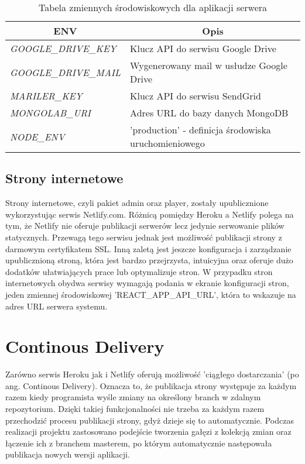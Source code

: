 \begin{table}[h!]
\centering
\begin{tabular}{|l|l|}
\hline
\multicolumn{1}{|c|}{\textbf{ENV}} & \multicolumn{1}{c|}{\textbf{Opis}} \\ \hline
\textit{GOOGLE\_DRIVE\_KEY} & Klucz API do serwisu Google Drive \\ \hline
\textit{GOOGLE\_DRIVE\_MAIL} & Wygenerowany mail w usłudze Google Drive \\ \hline
\textit{MARILER\_KEY} & Klucz API do serwisu SendGrid \\ \hline
\textit{MONGOLAB\_URI} & Adres URL do bazy danych MongoDB \\ \hline
\textit{NODE\_ENV} & 'production' - definicja środowiska uruchomieniowego \\ \hline
\end{tabular}
\caption{Tabela zmiennych środowiskowych dla aplikacji serwera}
\end{table}

\subsection{Strony internetowe}
Strony internetowe, czyli pakiet admin oraz player, zostały upublicznione wykorzystując serwis Netlify.com. Różnicą pomiędzy Heroku a Netlify polega na tym, że Netlify nie oferuje publikacji serwerów lecz jedynie serwowanie plików statycznych. Przewagą tego serwisu jednak jest możliwość publikacji strony z darmowym certyfikatem SSL. Inną zaletą jest jeszcze konfiguracja i zarządzanie upublicznioną stroną, która jest bardzo przejrzysta, intuicyjna oraz oferuje dużo dodatków ułatwiających prace lub optymalizuje stron. W przypadku stron internetowych obydwa serwisy wymagają podania w ekranie konfiguracji stron, jeden zmiennej środowiskowej 'REACT\_APP\_API\_URL', która to wskazuje na adres URL serwera systemu.

\section{Continous Delivery}
Zarówno serwis Heroku jak i Netlify oferują możliwość 'ciągłego dostarczania' (po ang. Continous Delivery). Oznacza to, że publikacja strony występuje za każdym razem kiedy programista wyśle zmiany na określony branch w zdalnym repozytorium. Dzięki takiej funkcjonalności nie trzeba za każdym razem przechodzić procesu publikacji strony, gdyż dzieje się to automatycznie. Podczas realizacji projektu zastosowano podejście tworzenia gałęzi z kolekcją zmian oraz łączenie ich z branchem masterem, po którym automatycznie następowała publikacja nowych wersji aplikacji.